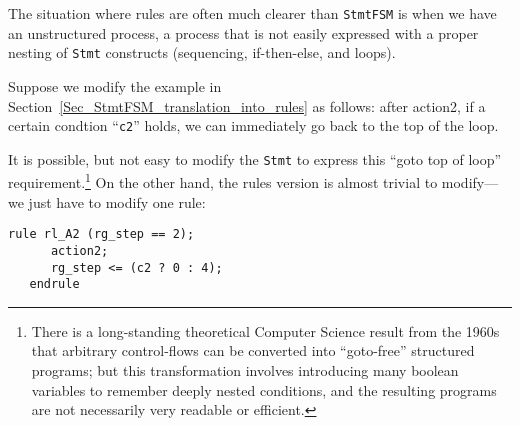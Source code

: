 The situation where rules are often much clearer than \verb|StmtFSM|
is when we have an unstructured process, {\ie} a process that is not
easily expressed with a proper nesting of \verb|Stmt| constructs
(sequencing, if-then-else, and loops).

Suppose we modify the example in
Section~\ref{Sec_StmtFSM_translation_into_rules} as follows: after
action2, if a certain condtion ``\verb|c2|'' holds, we can immediately
go back to the top of the loop.

It is possible, but not easy to modify the \verb|Stmt| to express this
``goto top of loop'' requirement.\footnote{There is a long-standing
theoretical Computer Science result from the 1960s that arbitrary
control-flows can be converted into ``goto-free'' structured programs;
but this transformation involves introducing many boolean variables to
remember deeply nested conditions, and the resulting programs are not
necessarily very readable or efficient.}  On the other hand, the rules
version is almost trivial to modify---we just have to modify one rule:

{\footnotesize
\begin{Verbatim}[frame=single,label=BSV]
   rule rl_A2 (rg_step == 2);
      action2;
      rg_step <= (c2 ? 0 : 4);
   endrule
\end{Verbatim}
}

